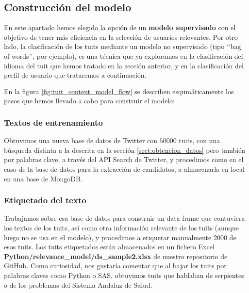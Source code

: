 \subsection{Construcción del modelo}
\label{sect:construccion_modelo_tuits_relevantes}
En este apartado hemos elegido la opción de un {\bf modelo supervisado} con el objetivo de tener más eficiencia en la selección de usuarios relevantes.
Por otro lado, la clasificación de los
tuits mediante un modelo no supervisado (tipo \lq\lq bag of words\rq\rq, por ejemplo), 
es una técnica que ya exploramos en la clasificación del idioma del tuit que hemos 
tratado en la sección anterior, y en la clasificación del perfil de usuario que trataremos
a continuación.  

En la figura \ref{fig:tuit_content_model_flow} se describen esqumáticamente los pasos que hemos llevado a cabo para construir el modelo:




\subsubsection{Textos de entrenamiento}

Obtuvimos una nueva base de datos de Twitter con $50000$ tuits, con una búsqueda distinta
a la descrita en la sección \ref{sect:obtencion_datos} pero también por palabras clave,
a través del API Search de Twitter, y procedimos como en el caso
de la base de datos para la extracción de candidatos, a almacenarla en local en una base de MongoDB.


\subsubsection{Etiquetado del texto}
Trabajamos sobre esa base de datos para construir un data frame que contuviera los textos de los tuits,
así como otra información relevante de los tuits (aunque luego no se usa en el modelo), y procedimos
a etiquetar manualmente $2000$ de esos tuits. Los tuits etiquetados están almacenados en un fichero
Excel {\bf Python/relevance\_model/ds\_sample2.xlsx} de nuestro repositorio de GitHub.
Como curiosidad, nos gustaría comentar que al bajar los tuits por palabras claves como Python o SAS, 
obtuvimos tuits que hablaban de serpientes o de los problemas del Sistema Andaluz de Salud. 

